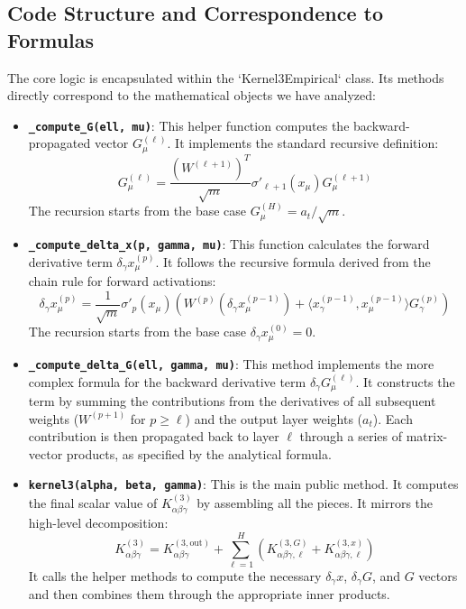 \documentclass[11pt,a4paper]{article}
\begin{document}
\subsection{Code Structure and Correspondence to Formulas}
The core logic is encapsulated within the `Kernel3Empirical` class. Its methods directly correspond to the mathematical objects we have analyzed:

\begin{itemize}
    \item \textbf{\texttt{\_compute\_G(ell, mu)}}: This helper function computes the backward-propagated vector $G^{(\ell)}_\mu$. It implements the standard recursive definition:
    \[ G^{(\ell)}_\mu = \frac{(W^{(\ell+1)})^T}{\sqrt{m}} \sigma'_{\ell+1}(x_\mu) G^{(\ell+1)}_\mu \]
    The recursion starts from the base case $G^{(H)}_\mu = a_t / \sqrt{m}$.

    \item \textbf{\texttt{\_compute\_delta\_x(p, gamma, mu)}}: This function calculates the forward derivative term $\delta_\gamma x^{(p)}_\mu$. It follows the recursive formula derived from the chain rule for forward activations:
    \[ \delta_\gamma x^{(p)}_\mu = \frac{1}{\sqrt{m}} \sigma'_{p}(x_\mu) \left( W^{(p)} (\delta_\gamma x^{(p-1)}_\mu) + \langle x^{(p-1)}_\gamma, x^{(p-1)}_\mu \rangle G^{(p)}_\gamma \right) \]
    The recursion starts from the base case $\delta_\gamma x^{(0)}_\mu = 0$.

    \item \textbf{\texttt{\_compute\_delta\_G(ell, gamma, mu)}}: This method implements the more complex formula for the backward derivative term $\delta_\gamma G^{(\ell)}_\mu$. It constructs the term by summing the contributions from the derivatives of all subsequent weights ($W^{(p+1)}$ for $p \ge \ell$) and the output layer weights ($a_t$). Each contribution is then propagated back to layer $\ell$ through a series of matrix-vector products, as specified by the analytical formula.

    \item \textbf{\texttt{kernel3(alpha, beta, gamma)}}: This is the main public method. It computes the final scalar value of $K^{(3)}_{\alpha\beta\gamma}$ by assembling all the pieces. It mirrors the high-level decomposition:
    \[ K^{(3)}_{\alpha\beta\gamma} = K^{(3, \text{out})}_{\alpha\beta\gamma} + \sum_{\ell=1}^H \left( K^{(3, G)}_{\alpha\beta\gamma, \ell} + K^{(3, x)}_{\alpha\beta\gamma, \ell} \right) \]
    It calls the helper methods to compute the necessary $\delta_\gamma x$, $\delta_\gamma G$, and $G$ vectors and then combines them through the appropriate inner products.
\end{itemize}
\end{document}
